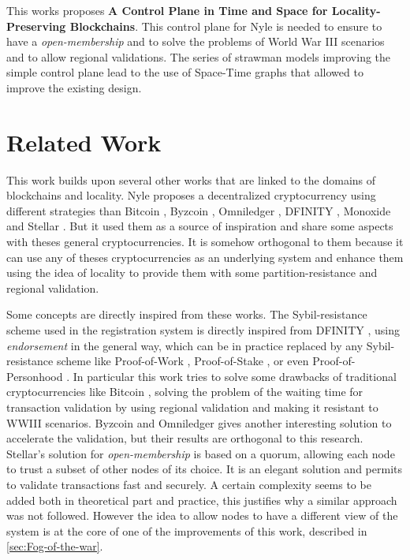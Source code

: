 \documentclass[a4paper,11pt,oneside]{report}
\begin{document}

This works proposes \textbf{A Control Plane in Time and Space for
Locality-Preserving Blockchains}. This control plane for Nyle is needed to
ensure to have a \textit{open-membership} and to solve the problems of World
War III scenarios and to allow regional validations. The series of strawman
models improving the simple control plane lead to the use of Space-Time graphs
that allowed to improve the existing design. 



\chapter{Related Work} \label{chap:RelatedWork} %

This work builds upon several other works that are linked to the domains of
blockchains and locality. Nyle proposes a decentralized cryptocurrency using
different strategies than Bitcoin \cite{Nakamoto2009}, Byzcoin \cite{Kogias2016},
Omniledger \cite{Kokoris-Kogias2017}, DFINITY \cite{Hanke2018}, Monoxide
\cite{Wang2019} and Stellar \cite{Lokhava2019}. But it used them as a source of inspiration
and share some aspects with theses general cryptocurrencies.  It is
somehow orthogonal to them because it can use any of theses cryptocurrencies as
an underlying system and enhance them using the idea of locality to provide them with some
partition-resistance and regional validation. 

Some concepts are directly inspired from these works. The Sybil-resistance
scheme used in the registration system is directly inspired from DFINITY
\cite{Hanke2018}, using \textit{endorsement} in the general way, which can be
in practice replaced by any Sybil-resistance scheme like Proof-of-Work
\cite{Nakamoto2009}, Proof-of-Stake \cite{wood2014ethereum}, or even
Proof-of-Personhood \cite{Borge2017}. In particular this work tries to solve
some drawbacks of traditional cryptocurrencies like Bitcoin \cite{Nakamoto2009},
solving the problem of the waiting time for transaction validation by using regional
validation and making it resistant to WWIII scenarios. Byzcoin
\cite{Kogias2016} and Omniledger \cite{Kokoris-Kogias2017} gives another
interesting solution to accelerate the validation, but their results are
orthogonal to this research. Stellar's solution for \textit{open-membership}
\cite{Lokhava2019} is based on a quorum, allowing each node to trust a subset
of other nodes of its choice. It is an elegant solution and permits to validate
transactions fast and securely. A certain complexity seems to be added both in
theoretical part and practice, this justifies why  a similar approach was not
followed. However the idea to allow nodes to have a different view of the
system is at the core of one of the improvements of this work, described in \autoref{sec:Fog-of-the-war}.
\end{document}
